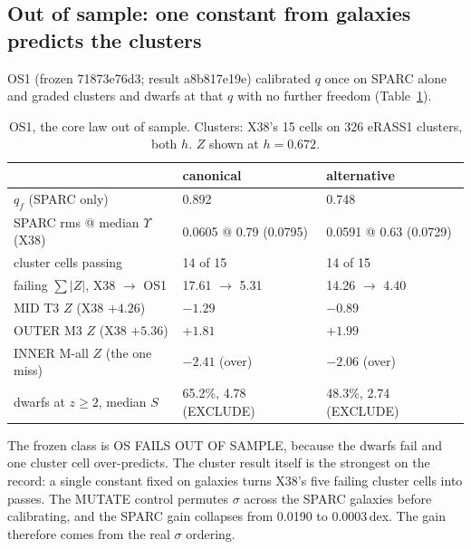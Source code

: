 \documentclass[10pt]{article}
\begin{document}
\subsection{Out of sample: one constant from galaxies predicts the clusters}
OS1 (frozen 71873e76d3; result a8b817e19e) calibrated $q$ once on SPARC alone and graded clusters and dwarfs at that $q$ with no further freedom (Table~\ref{tab:os1}).

\begin{table}[t]\centering\small
\caption{OS1, the core law out of sample. Clusters: X38's 15 cells on 326 eRASS1 clusters, both $h$. $Z$ shown at $h=0.672$.}\label{tab:os1}
\begin{tabular}{lll}
\toprule
 & canonical & alternative\\
\midrule
$q_f$ (SPARC only) & 0.892 & 0.748\\
SPARC rms @ median $\Upsilon$ (X38) & 0.0605 @ 0.79 (0.0795) & 0.0591 @ 0.63 (0.0729)\\
cluster cells passing & 14 of 15 & 14 of 15\\
failing $\sum|Z|$, X38 $\to$ OS1 & 17.61 $\to$ 5.31 & 14.26 $\to$ 4.40\\
MID T3 $Z$ (X38 $+4.26$) & $-1.29$ & $-0.89$\\
OUTER M3 $Z$ (X38 $+5.36$) & $+1.81$ & $+1.99$\\
INNER M-all $Z$ (the one miss) & $-2.41$ (over) & $-2.06$ (over)\\
dwarfs at $z\ge2$, median $S$ & 65.2\%, 4.78 (EXCLUDE) & 48.3\%, 2.74 (EXCLUDE)\\
\bottomrule
\end{tabular}
\end{table}

The frozen class is OS FAILS OUT OF SAMPLE, because the dwarfs fail and one cluster cell over-predicts. The cluster result itself is the strongest on the record: a single constant fixed on galaxies turns X38's five failing cluster cells into passes. The MUTATE control permutes $\sigma$ across the SPARC galaxies before calibrating, and the SPARC gain collapses from 0.0190 to 0.0003\,dex. The gain therefore comes from the real $\sigma$ ordering.
\end{document}
